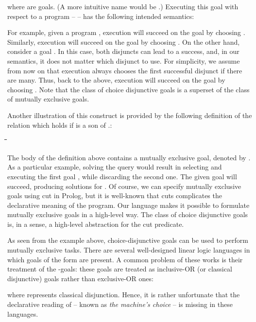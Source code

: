 \documentclass[letter]{ieice}
\newenvironment{exmple}{
 \begingroup \begin{tabbing} \hspace{2em}\= \hspace{3em}\= \hspace{3em}\=
\hspace{3em}\= \hspace{3em}\= \hspace{3em}\= \kill}{
 \end{tabbing}\endgroup}
\begin{document}
 where  are goals. (A more intuitive name would be .)
Executing this goal with respect to a program  --  --
 has the following intended semantics: 



\noindent For example, given a program , execution will succeed on
the goal  by choosing . Similarly,  execution will succeed on
the goal  by choosing . On the other hand,
consider a goal . In this case, both disjuncts can lead to a success, and,
in our semantics, it does not matter which disjunct to use. For simplicity, we assume from now on 
that execution always chooses the first
successful disjunct if there are many. Thus, back to the above, execution will succeed on
the goal  by choosing .
Note that the class of choice disjunctive goals is a superset of 
 the class of mutually exclusive goals.

    Another
illustration of this construct is provided by the following definition of the
relation  which holds if  is a son of .:

\begin{exmple}
  \> \hspace{6em}      \\ 
 \> \hspace{6em} 
\end{exmple}
\noindent
The body of the definition above contains a mutually exclusive goal, denoted by .
 As a particular example, solving the query  would result in selecting and 
executing the first goal , while discarding the second one.  The given goal will
succeed, producing solutions for . Of course, we can specify mutually exclusive goals using cut
in Prolog, but it is well-known that cuts
complicates the declarative meaning of the program. Our language makes it possible to formulate mutually exclusive goals in a high-level way.
The class of choice disjunctive goals is, in a sense, a high-level abstraction for the cut
predicate.


     As seen from the example above, choice-disjunctive  goals can be used to perform mutually exclusive
 tasks.
There are several well-designed linear logic languages \cite{HM94,Wini} 
 in which
goals of the form  are present. A common 
problem of these works  is their treatment of the 
-goals: these goals are treated as inclusive-OR (or classical disjunctive) goals rather than  
exclusive-OR ones:


\noindent where  represents classical disjunction. 
Hence, it is rather unfortunate that the declarative reading of  -- 
known as {\it the machine's choice} --
 is missing in these languages.
\end{document}
